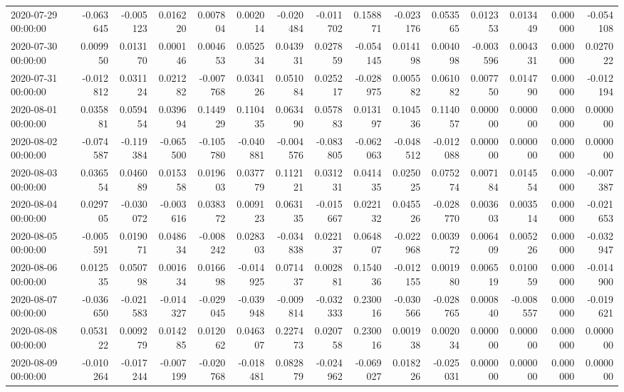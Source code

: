 \begin{tabular}{lrrrrrrrrrrrrrr}
2020-07-29 00:00:00 & -0.063645 & -0.005123 & 0.016220 & 0.007804 & 0.002014 & -0.020484 & -0.011702 & 0.158871 & -0.023176 & 0.053565 & 0.012353 & 0.013449 & 0.000000 & -0.054108 \\
2020-07-30 00:00:00 & 0.009950 & 0.013170 & 0.000146 & 0.004653 & 0.052534 & 0.043931 & 0.027859 & -0.054145 & 0.014198 & 0.004098 & -0.003596 & 0.004331 & 0.000000 & 0.027022 \\
2020-07-31 00:00:00 & -0.012812 & 0.031124 & 0.021282 & -0.007768 & 0.034126 & 0.051084 & 0.025217 & -0.028975 & 0.005582 & 0.061082 & 0.007750 & 0.014790 & 0.000000 & -0.012194 \\
2020-08-01 00:00:00 & 0.035881 & 0.059454 & 0.039694 & 0.144929 & 0.110435 & 0.063490 & 0.057883 & 0.013197 & 0.104536 & 0.114057 & 0.000000 & 0.000000 & 0.000000 & 0.000000 \\
2020-08-02 00:00:00 & -0.074587 & -0.119384 & -0.065500 & -0.105780 & -0.040881 & -0.004576 & -0.083805 & -0.062063 & -0.048512 & -0.012088 & 0.000000 & 0.000000 & 0.000000 & 0.000000 \\
2020-08-03 00:00:00 & 0.036554 & 0.046089 & 0.015358 & 0.019603 & 0.037779 & 0.112121 & 0.031231 & 0.041435 & 0.025025 & 0.075274 & 0.007184 & 0.014554 & 0.000000 & -0.007387 \\
2020-08-04 00:00:00 & 0.029705 & -0.030072 & -0.003616 & 0.038372 & 0.009123 & 0.063135 & -0.015667 & 0.022132 & 0.045526 & -0.028770 & 0.003603 & 0.003514 & 0.000000 & -0.021653 \\
2020-08-05 00:00:00 & -0.005591 & 0.019071 & 0.048634 & -0.008242 & 0.028303 & -0.034838 & 0.022137 & 0.064807 & -0.022968 & 0.003972 & 0.006409 & 0.005226 & 0.000000 & -0.032947 \\
2020-08-06 00:00:00 & 0.012535 & 0.050798 & 0.001634 & 0.016698 & -0.014925 & 0.071437 & 0.002881 & 0.154036 & -0.012155 & 0.001980 & 0.006519 & 0.010059 & 0.000000 & -0.014900 \\
2020-08-07 00:00:00 & -0.036650 & -0.021583 & -0.014327 & -0.029045 & -0.039948 & -0.009814 & -0.032333 & 0.230016 & -0.030566 & -0.028765 & 0.000840 & -0.008557 & 0.000000 & -0.019621 \\
2020-08-08 00:00:00 & 0.053122 & 0.009279 & 0.014285 & 0.012062 & 0.046307 & 0.227473 & 0.020758 & 0.230016 & 0.001938 & 0.002034 & 0.000000 & 0.000000 & 0.000000 & 0.000000 \\
2020-08-09 00:00:00 & -0.010264 & -0.017244 & -0.007199 & -0.020768 & -0.018481 & 0.082879 & -0.024962 & -0.069027 & 0.018226 & -0.025031 & 0.000000 & 0.000000 & 0.000000 & 0.000000 \\

\end{tabular}
